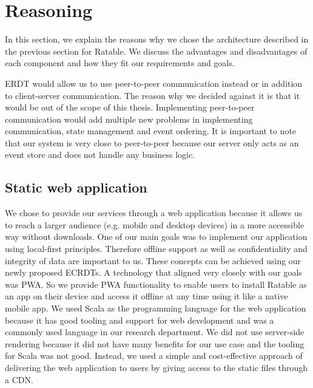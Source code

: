 \documentclass[
	english,
	ruledheaders=section,   %
	class=report,		    %
	thesis={type=bachelor}, %
	accentcolor=9c,			%
	custommargins=true,    %
	marginpar=false,        %
	parskip=half-,          %
	fontsize=11pt,          %
]{tudapub}
\begin{document}
\section{Reasoning}
In this section, we explain the reasons why we chose the architecture described in the previous section for Ratable. We discuss the advantages and disadvantages of each component and how they fit our requirements and goals.

ERDT would allow us to use peer-to-peer communication instead or in addition to client-server communication. The reason why we decided against it is that it would be out of the scope of this thesis. Implementing peer-to-peer communication would add multiple new problems in implementing communication, state management and event ordering. It is important to note that our system is very close to peer-to-peer because our server only acts as an event store and does not handle any business logic.

\subsection{Static web application}
We chose to provide our services through a web application because it allows us to reach a larger audience (e.g. mobile and desktop devices) in a more accessible way without downloads. One of our main goals was to implement our application using local-first principles. Therefore offline support as well as confidentiality and integrity of data are important to us. These concepts can be achieved using our newly proposed ECRDTs. A technology that aligned very closely with our goals was PWA. So we provide PWA functionality to enable users to install Ratable as an app on their device and access it offline at any time using it like a native mobile app. We used Scala as the programming language for the web application because it has good tooling and support for web development and was a commonly used language in our research department. We did not use server-side rendering because it did not have many benefits for our use case and the tooling for Scala was not good. Instead, we used a simple and cost-effective approach of delivering the web application to users by giving access to the static files through a CDN.
\end{document}

